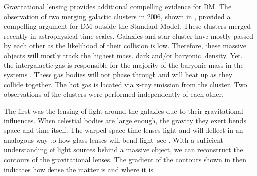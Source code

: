 \begin{figure}[ht]
\end{figure}

Gravitational lensing provides additional compelling evidence for DM.
The observation of two merging galactic clusters in 2006, shown in , provided a compelling argument for DM outside the Standard Model.
These clusters merged recently in astrophysical time scales.
Galaxies and star cluster have mostly passed by each other as the likelihood of their collision is low.
Therefore, these massive objects will mostly track the highest mass, dark and/or baryonic, density.
Yet, the intergalactic gas is responsible for the majority of the baryonic mass in the systems \cite{Hooper:DMHistory}.
These gas bodies will not phase through and will heat up as they collide together.
The hot gas is located via x-ray emission from the cluster.
Two observations of the clusters were performed independently of each other.

The first was the lensing of light around the galaxies due to their gravitational influences.
When celestial bodies are large enough, the gravity they exert bends space and time itself.
The warped space-time lenses light and will deflect in an analogous way to how glass lenses will bend light, see .
With a sufficient understanding of light sources behind a massive object, we can reconstruct the contours of the gravitational lenses.
The gradient of the contours shown in  then indicates how dense the matter is and where it is.

